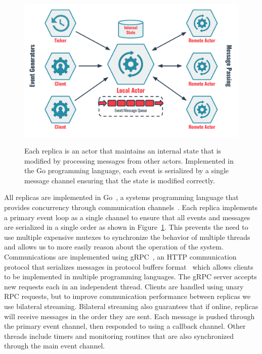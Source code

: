 \begin{figure}
    \begin{center}
        \includegraphics[width=5in]{figures/ch05_actor_model.pdf}
    \end{center}
    \renewcommand{\baselinestretch}{1}
    \small\normalsize

    \begin{quote}
        \caption[Replica Actor Model]{Each replica is an actor that maintains an internal state that is modified by processing messages from other actors. Implemented in the Go programming language, each event is serialized by a single message channel ensuring that the state is modified correctly.}
        \label{fig:ch05_actor_model}
    \end{quote}
\end{figure}
\renewcommand{\baselinestretch}{2}
\small\normalsize

All replicas are implemented in Go~\cite{golang}, a systems programming language that provides concurrency through communication channels~\cite{csp}.
Each replica implements a primary event loop as a single channel to ensure that all events and messages are serialized in a single order as shown in Figure~\ref{fig:ch05_actor_model}.
This prevents the need to use multiple expensive mutexes to synchronize the behavior of multiple threads and allows us to more easily reason about the operation of the system.
Communications are implemented using gRPC~\cite{grpc}, an HTTP communication protocol that serializes messages in protocol buffers format~\cite{protocol_buffers} which allows clients to be implemented in multiple programming languages.
The gRPC server accepts new requests each in an independent thread.
Clients are handled using unary RPC requests, but to improve communication performance between replicas we use bilateral streaming.
Bilateral streaming also guarantees that if online, replicas will receive messages in the order they are sent.
Each message is pushed through the primary event channel, then responded to using a callback channel.
Other threads include timers and monitoring routines that are also synchronized through the main event channel.

